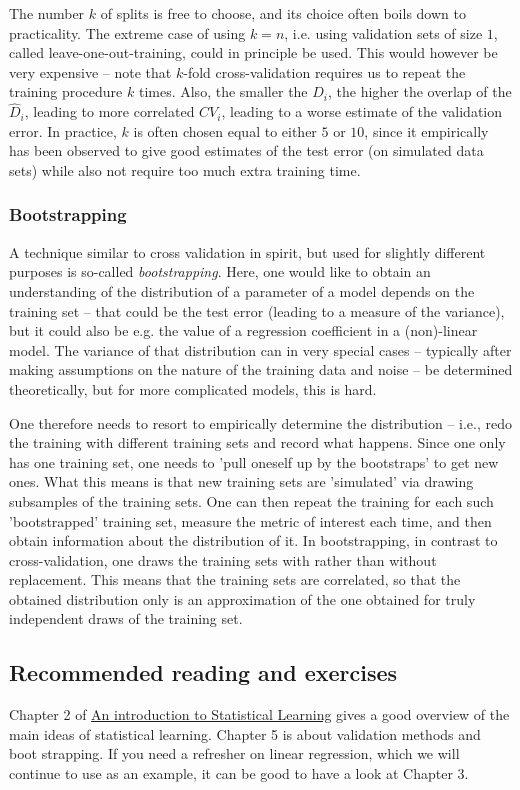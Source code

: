 \documentclass{article}
\begin{document}
The number $k$ of splits is free to choose, and its choice often boils down to practicality. The extreme case of using $k=n$, i.e. using validation sets of size $1$, called leave-one-out-training, could in principle be used. This would however be very expensive -- note that $k$-fold cross-validation requires us to repeat the training procedure $k$ times. Also, the smaller the $D_i$, the higher the overlap of the $\hat{D}_i$, leading to more correlated $CV_i$, leading to a worse estimate of the validation error. In practice, $k$ is  often chosen equal to either $5$ or $10$, since it empirically has been observed to give good estimates of the test error (on simulated data sets) while also not require too much extra training time.

\subsubsection{Bootstrapping} A technique similar to cross validation in spirit, but used for slightly different purposes is so-called \emph{bootstrapping}. Here, one would like to obtain an understanding of the distribution of a parameter of a model depends on the training set -- that could be the test error (leading to a measure of the variance), but it could also be e.g. the value of a regression coefficient in a (non)-linear model. The variance of that distribution can in very special cases -- typically after making assumptions on the nature of the training data and noise -- be determined theoretically, but for more complicated models, this is hard. 

One therefore needs to resort to empirically determine the distribution -- i.e., redo the training with different training sets and record what happens. Since one only has one training set, one needs to 'pull oneself up by the bootstraps' to get new ones. What this means is that new training sets are 'simulated' via drawing subsamples of the training sets. One can then repeat the training for each such 'bootstrapped' training set, measure the metric of interest each time, and then obtain information about the distribution of it. In bootstrapping, in contrast to cross-validation, one draws the training sets with rather than without replacement. This means that the training sets are correlated, so that the obtained distribution only is an approximation of the one obtained for truly independent draws of the training set.

\subsection{Recommended reading and exercises}
Chapter 2 of \href{https://www.statlearning.com/}{An introduction to Statistical Learning} gives a good overview of the main ideas of statistical learning. Chapter 5 is about validation methods and boot strapping. If you need a refresher on linear regression, which we will continue to use as an example, it can be good to have a look at Chapter 3.
\end{document}
